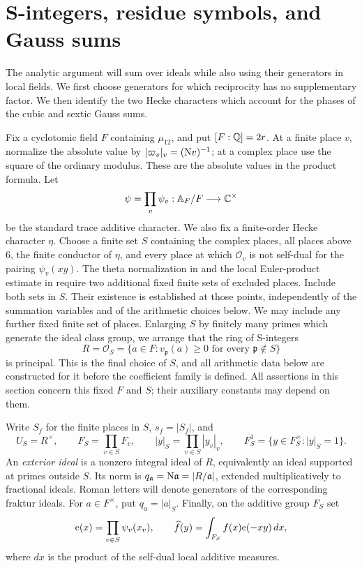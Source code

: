 \section{S-integers, residue symbols, and Gauss sums}\label{sec:arithmetic}

The analytic argument will sum over ideals while also using their generators
in local fields.  We first choose generators for which reciprocity has no
supplementary factor.  We then identify the two Hecke characters which account
for the phases of the cubic and sextic Gauss sums.

Fix a cyclotomic field \(F\) containing \(\mu_{12}\), and put
\([F:\mathbb{Q}]=2r\).  At a finite place \(v\), normalize the absolute value by
\(|\varpi_v|_v=(\mathrm{N} v)^{-1}\); at a complex place use the square of the
ordinary modulus.  These are the absolute values in the product formula.
Let
\[
 \psi=\prod_v\psi_v:\mathbb{A}_F/F\longrightarrow \mathbb{C}^\times
\]
be the standard trace additive character.  We also fix a finite-order Hecke
character \(\eta\).  Choose a finite set \(S\) containing the complex places,
all places above \(6\), the finite conductor of \(\eta\), and every place at
which \(\mathcal O_v\) is not self-dual for the pairing
\(\psi_v(xy)\).  The theta normalization in 
and the local Euler-product estimate in  require
two additional fixed finite sets of excluded places.  Include both sets in
\(S\).  Their existence is established at those points, independently of
the summation variables and of the arithmetic choices below.  We may
include any further fixed finite set of places.
Enlarging \(S\) by finitely many primes which generate the ideal class group,
we arrange that the ring of S-integers
\[
 R=\mathcal O_S=\{a\in F:v_{\mathfrak p}(a)\geq0
                       \text{ for every }\mathfrak p\notin S\}
\]
is principal.  This is the final choice of \(S\), and all arithmetic data
below are constructed for it before the coefficient family is defined.
All assertions in this section concern this fixed \(F\) and \(S\); their
auxiliary constants may depend on them.

Write \(S_f\) for the finite places in \(S\), \(s_f=|S_f|\), and
\[
 U_S=R^\times,\qquad F_S=\prod_{v\in S}F_v,\qquad
 |y|_S=\prod_{v\in S}|y_v|_v,\qquad
 F_S^1=\{y\in F_S^\times:|y|_S=1\}.
\]
An \emph{exterior ideal} is a nonzero integral ideal of \(R\), equivalently
an ideal supported at primes outside \(S\).  Its norm is
\(q_{\mathfrak a}=\mathrm{N}\mathfrak a=|R/\mathfrak a|\), extended
multiplicatively to fractional ideals.  Roman letters will denote generators
of the corresponding fraktur ideals.  For \(a\in F^\times\), put
\(q_a=|a|_S\).  Finally, on the additive group \(F_S\) set
\[
 \mathrm{e}(x)=\prod_{v\in S}\psi_v(x_v),
 \qquad
 \widehat f(y)=\int_{F_S}f(x)\mathrm{e}(-xy)\,dx,
\]
where \(dx\) is the product of the self-dual local additive measures.

